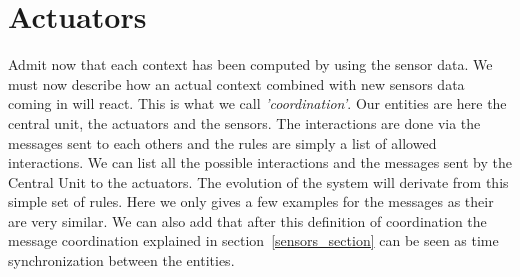 \documentclass{acm_proc_article-sp}
\begin{document}
\section{Actuators}
Admit now that each context has been computed by using the sensor data.
We must now describe how an actual context combined with new sensors data coming in will react. 
This is what we call \textit{'coordination'}. 
Our entities are here the central unit, the actuators and the sensors.
The interactions are done via the messages sent to each others and the rules are simply a list of allowed interactions.
We can list all the possible interactions and the messages sent by the Central Unit to the actuators.
The evolution of the system will derivate from this simple set of rules.
Here we only gives a few examples for the messages as their are very similar.
We can also add that after this definition of coordination the message coordination explained in section~\ref{sensors_section} can be seen as time synchronization between the entities.
\end{document}
